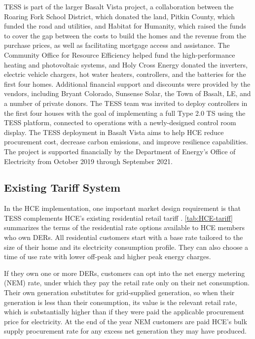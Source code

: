 TESS is part of the larger Basalt Vista project, a collaboration between the Roaring Fork School District, which donated the land, Pitkin County, which funded the road and utilities, and Habitat for Humanity, which raised the funds to cover the gap between the costs to build the homes and the revenue from the purchase prices, as well as facilitating mortgage access and assistance.  The Community Office for Resource Efficiency helped fund the high-performance heating and photovoltaic systems, and Holy Cross Energy donated the inverters, electric vehicle chargers, hot water heaters, controllers, and the batteries for the first four homes.  Additional financial support and discounts were provided by the vendors, including Bryant Colorado, Sunsense Solar, the Town of Basalt, LE, and a number of private donors. The TESS team was invited to deploy controllers in the first four houses with the goal of implementing a full Type 2.0 TS using the TESS platform, connected to operations with a newly-designed control room display. The TESS deployment in Basalt Vista aims to help HCE reduce procurement cost, decrease carbon emissions, and improve resilience capabilities. The project is supported financially by the Department of Energy's Office of Electricity from October 2019 through September 2021.

\subsection{Existing Tariff System}\label{sec:HCE_tariff}

In the HCE implementation, one important market design requirement is that TESS complements HCE's existing residential retail tariff \citep{holy_cross_energy_electric_2020}.
\cref{tab:HCE-tariff} summarizes the terms of the residential rate options available to HCE members who own DERs. All residential customers start with a base rate tailored to the size of their home and its electricity consumption profile. They can also choose a time of use rate with lower off-peak and higher peak energy charges. 



If they own one or more DERs, customers can opt into the net energy metering (NEM) rate, under which they pay the retail rate only on their net consumption. Their own generation substitutes for grid-supplied generation, so when their generation is less than their consumption, its value is the relevant retail rate, which is substantially higher than if they were paid the applicable procurement price for electricity. At the end of the year NEM customers are paid HCE's bulk supply procurement rate for any excess net generation they may have produced.

